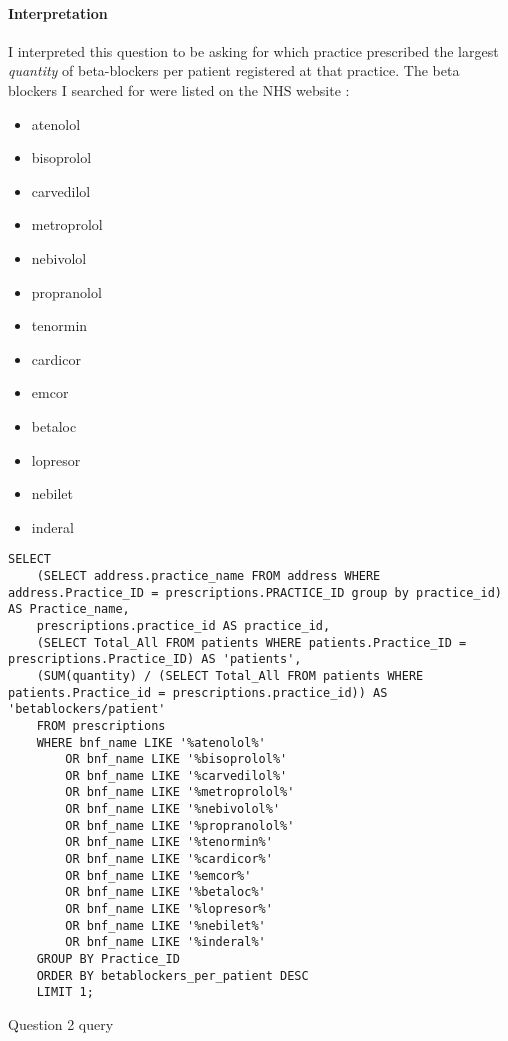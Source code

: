 \documentclass{report}
\begin{document}
\paragraph{Interpretation}
I interpreted this question to be asking for which practice prescribed the largest \textit{quantity} of beta-blockers per patient registered at that practice. The beta blockers I searched for were listed on the NHS website \cite{nhsbetablockers}:
\begin{itemize}
\item atenolol
\item bisoprolol
\item carvedilol
\item metroprolol
\item nebivolol
\item propranolol
\item tenormin
\item cardicor
\item emcor
\item betaloc
\item lopresor
\item nebilet
\item inderal
\end{itemize}

\begin{listing}[H]
\begin{verbatim}
SELECT 
    (SELECT address.practice_name FROM address WHERE address.Practice_ID = prescriptions.PRACTICE_ID group by practice_id) AS Practice_name, 
    prescriptions.practice_id AS practice_id,
	(SELECT Total_All FROM patients WHERE patients.Practice_ID = prescriptions.Practice_ID) AS 'patients',
    (SUM(quantity) / (SELECT Total_All FROM patients WHERE patients.Practice_id = prescriptions.practice_id)) AS 'betablockers/patient' 
    FROM prescriptions 
    WHERE bnf_name LIKE '%atenolol%' 
        OR bnf_name LIKE '%bisoprolol%' 
        OR bnf_name LIKE '%carvedilol%' 
        OR bnf_name LIKE '%metroprolol%' 
        OR bnf_name LIKE '%nebivolol%' 
        OR bnf_name LIKE '%propranolol%' 
        OR bnf_name LIKE '%tenormin%' 
        OR bnf_name LIKE '%cardicor%' 
        OR bnf_name LIKE '%emcor%' 
        OR bnf_name LIKE '%betaloc%' 
        OR bnf_name LIKE '%lopresor%' 
        OR bnf_name LIKE '%nebilet%' 
        OR bnf_name LIKE '%inderal%' 
    GROUP BY Practice_ID 
    ORDER BY betablockers_per_patient DESC 
    LIMIT 1;
\end{verbatim}
\caption{Question 2 query}
\label{lst: Q2-1}
\end{listing}
\end{document}
